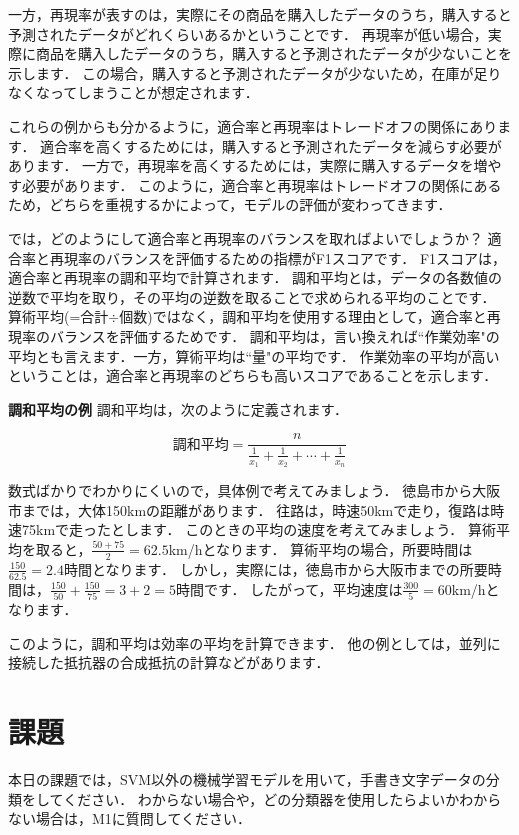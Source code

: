 \documentclass{jarticle}
\begin{document}
一方，再現率が表すのは，実際にその商品を購入したデータのうち，購入すると予測されたデータがどれくらいあるかということです．
再現率が低い場合，実際に商品を購入したデータのうち，購入すると予測されたデータが少ないことを示します．
この場合，購入すると予測されたデータが少ないため，在庫が足りなくなってしまうことが想定されます．

これらの例からも分かるように，適合率と再現率はトレードオフの関係にあります．
適合率を高くするためには，購入すると予測されたデータを減らす必要があります．
一方で，再現率を高くするためには，実際に購入するデータを増やす必要があります．
このように，適合率と再現率はトレードオフの関係にあるため，どちらを重視するかによって，モデルの評価が変わってきます．

では，どのようにして適合率と再現率のバランスを取ればよいでしょうか？
適合率と再現率のバランスを評価するための指標がF1スコアです．
F1スコアは，適合率と再現率の調和平均で計算されます．
調和平均とは，データの各数値の逆数で平均を取り，その平均の逆数を取ることで求められる平均のことです．
算術平均(=合計$\div$個数)ではなく，調和平均を使用する理由として，適合率と再現率のバランスを評価するためです．
調和平均は，言い換えれば``作業効率"の平均とも言えます．一方，算術平均は``量"の平均です．
作業効率の平均が高いということは，適合率と再現率のどちらも高いスコアであることを示します．

\begin{itembox}[l]{\textbf{調和平均の例}}
調和平均は，次のように定義されます．

\begin{equation}
  \text{調和平均} = \frac{n}{\frac{1}{x_1} + \frac{1}{x_2} + \cdots + \frac{1}{x_n}}
\end{equation}

数式ばかりでわかりにくいので，具体例で考えてみましょう．
徳島市から大阪市までは，大体150kmの距離があります．
往路は，時速50kmで走り，復路は時速75kmで走ったとします．
このときの平均の速度を考えてみましょう．
算術平均を取ると，$\frac{50 + 75}{2} = 62.5$km/hとなります．
算術平均の場合，所要時間は$\frac{150}{62.5} = 2.4$時間となります．
しかし，実際には，徳島市から大阪市までの所要時間は，$\frac{150}{50} + \frac{150}{75} = 3 + 2 = 5$時間です．
したがって，平均速度は$\frac{300}{5} = 60$km/hとなります．

このように，調和平均は効率の平均を計算できます．
他の例としては，並列に接続した抵抗器の合成抵抗の計算などがあります．
\end{itembox}

\section{課題}
本日の課題では，SVM以外の機械学習モデルを用いて，手書き文字データの分類をしてください．
わからない場合や，どの分類器を使用したらよいかわからない場合は，M1に質問してください．
\end{document}
